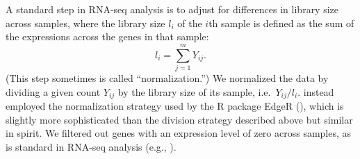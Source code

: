 \documentclass[12pt]{article}
\begin{document}
	
	A standard step in RNA-seq analysis is to adjust for differences in library size across samples, where the library size $l_i$ of the $i$th sample is defined as the sum of the expressions across the genes in that sample:
	$$l_i = \sum_{j=1}^m Y_{ij}.$$ (This step sometimes is called ``normalization.'') We normalized the data by dividing a given count $Y_{ij}$ by the library size of its sample, i.e.\ $Y_{ij}/l_i$. \cite{Li2022} instead employed the normalization strategy used by the R package EdgeR (\cite{Robinson2010}), which is slightly more sophisticated than the division strategy described above but similar in spirit. We filtered out genes with an expression level of zero across samples, as is standard in RNA-seq analysis (e.g., \cite{Love2014}).
	
	\printbibliography
	
\end{document}
